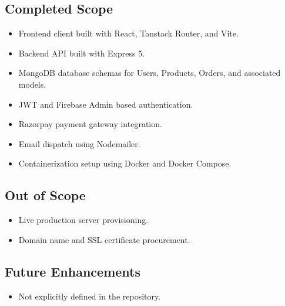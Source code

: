 \documentclass[11pt,a4paper]{article}
\begin{document}
\subsection*{Completed Scope}
\begin{itemize}[leftmargin=*]
    \item Frontend client built with React, Tanstack Router, and Vite.
    \item Backend API built with Express 5.
    \item MongoDB database schemas for Users, Products, Orders, and associated models.
    \item JWT and Firebase Admin based authentication.
    \item Razorpay payment gateway integration.
    \item Email dispatch using Nodemailer.
    \item Containerization setup using Docker and Docker Compose.
\end{itemize}

\subsection*{Out of Scope}
\begin{itemize}[leftmargin=*]
    \item Live production server provisioning.
    \item Domain name and SSL certificate procurement.
\end{itemize}

\subsection*{Future Enhancements}
\begin{itemize}[leftmargin=*]
    \item Not explicitly defined in the repository.
\end{itemize}

\end{document}
